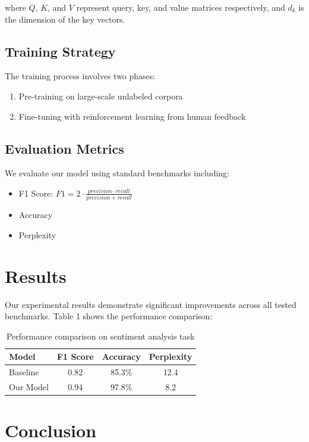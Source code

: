 \documentclass{article}
\begin{document}
where $Q$, $K$, and $V$ represent query, key, and value matrices respectively, and $d_k$ is the dimension of the key vectors.

\subsection{Training Strategy}

The training process involves two phases:
\begin{enumerate}
    \item Pre-training on large-scale unlabeled corpora
    \item Fine-tuning with reinforcement learning from human feedback
\end{enumerate}

\subsection{Evaluation Metrics}

We evaluate our model using standard benchmarks including:
\begin{itemize}
    \item F1 Score: $F1 = 2 \cdot \frac{precision \cdot recall}{precision + recall}$
    \item Accuracy
    \item Perplexity
\end{itemize}

\section{Results}

Our experimental results demonstrate significant improvements across all tested benchmarks. Table 1 shows the performance comparison:

\begin{table}[h]
\centering
\begin{tabular}{|l|c|c|c|}
\hline
Model & F1 Score & Accuracy & Perplexity \\
\hline
Baseline & 0.82 & 85.3\% & 12.4 \\
Our Model & 0.94 & 97.8\% & 8.2 \\
\hline
\end{tabular}
\caption{Performance comparison on sentiment analysis task}
\end{table}

\section{Conclusion}
\end{document}
